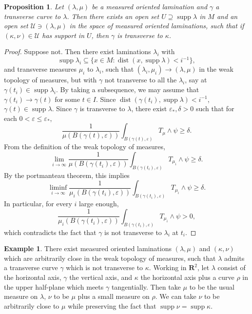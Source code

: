 \documentclass[reqno,10pt]{amsart}
\newcommand{\RR}{\mathbf{R}}
\DeclareMathOperator{\dist}{dist}
\DeclareMathOperator{\supp}{supp}
\newtheorem{proposition}[theorem]{Proposition}
\theoremstyle{definition}
\newtheorem{example}[theorem]{Example}
\numberwithin{equation}{section}
\begin{document}
\begin{proposition}
Let $(\lambda, \mu)$ be a measured oriented lamination and $\gamma$ a transverse curve to $\lambda$.
Then there exists an open set $U \supseteq \supp \lambda$ in $M$ and an open set $\mathcal U \ni (\lambda, \mu)$ in the space of measured oriented laminations, such that if $(\kappa, \nu) \in \mathcal U$ has support in $U$, then $\gamma$ is transverse to $\kappa$.
\end{proposition}
\begin{proof}
Suppose not. Then there exist laminations $\lambda_i$ with
$$\supp \lambda_i \subseteq \{x \in M: \dist(x, \supp \lambda) < i^{-1}\},$$
and transverse measures $\mu_i$ to $\lambda_i$, such that $(\lambda_i, \mu_i) \to (\lambda, \mu)$ in the weak topology of measures, but with $\gamma$ not transverse to all the $\lambda_i$, say at $\gamma(t_i) \in \supp \lambda_i$.
By taking a subsequence, we may assume that $\gamma(t_i) \to \gamma(t)$ for some $t \in I$.
Since $\dist(\gamma(t_i), \supp \lambda) < i^{-1}$, $\gamma(t) \in \supp \lambda$.
Since $\gamma$ is transverse to $\lambda$, there exist $\varepsilon_*, \delta > 0$ such that for each $0 < \varepsilon \leq \varepsilon_*$,
$$\frac{1}{\mu(B(\gamma(t), \varepsilon))} \int_{B(\gamma(t), \varepsilon)} T_\mu \wedge \psi \geq \delta.$$
From the definition of the weak topology of measures,
$$\lim_{i \to \infty} \frac{1}{\mu(B(\gamma(t_i), \varepsilon))} \int_{B(\gamma(t_i), \varepsilon)} T_{\mu_i} \wedge \psi \geq \delta.$$
By the portmanteau theorem, this implies
$$\liminf_{i \to \infty} \frac{1}{\mu_i(B(\gamma(t_i), \varepsilon))} \int_{B(\gamma(t_i), \varepsilon)} T_{\mu_i} \wedge \psi \geq \delta.$$
In particular, for every $i$ large enough,
$$\frac{1}{\mu_i(B(\gamma(t_i), \varepsilon))} \int_{B(\gamma(t_i), \varepsilon)} T_{\mu_i} \wedge \psi > 0,$$
which contradicts the fact that $\gamma$ is not transverse to $\lambda_i$ at $t_i$.
\end{proof}

\begin{example}
There exist measured oriented laminations $(\lambda, \mu)$ and $(\kappa, \nu)$ which are arbitrarily close in the weak topology of measures, such that $\lambda$ admits a transverse curve $\gamma$ which is not transverse to $\kappa$.
Working in $\RR^2$, let $\lambda$ consist of the horizontal axis, $\gamma$ the vertical axis, and $\kappa$ the horizontal axis plus a curve $\rho$ in the upper half-plane which meets $\gamma$ tangentially.
Then take $\mu$ to be the usual measure on $\lambda$, $\nu$ to be $\mu$ plus a small measure on $\rho$.
We can take $\nu$ to be arbitrarily close to $\mu$ while preserving the fact that $\supp \nu = \supp \kappa$.
\end{example}
\end{document}
